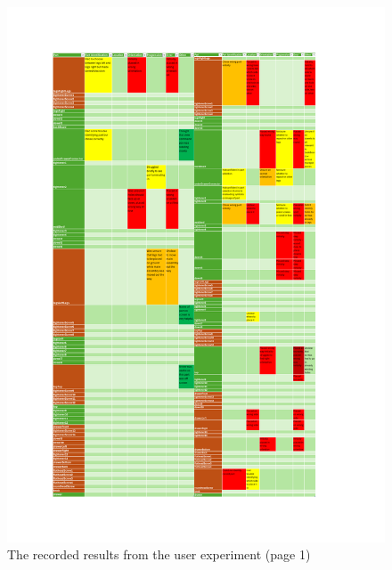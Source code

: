 \documentclass{l4proj}
\begin{document}
\begin{appendices}
\begin{figure}
    \centering
    \includegraphics[width=1\linewidth]{dissertation//images/results1.pdf}
    \caption{The recorded results from the user experiment (page 1)}
\end{figure}


\end{appendices}
\end{document}
